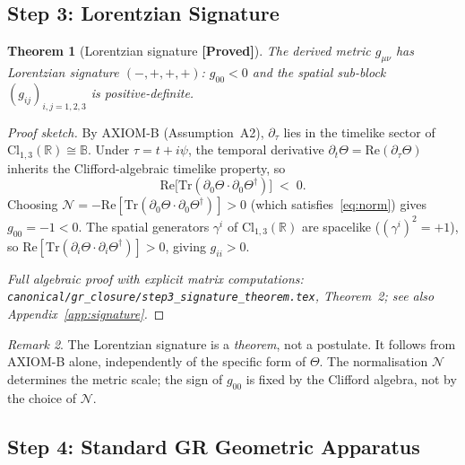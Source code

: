 \documentclass[12pt,a4paper]{article}
\newtheorem{theorem}{Theorem}[section]
\theoremstyle{definition}
\theoremstyle{remark}
\newtheorem{remark}[theorem]{Remark}
\newcommand{\PROVED}{\textbf{[Proved]}}
\newcommand{\B}{\mathbb{B}}
\newcommand{\R}{\mathbb{R}}
\newcommand{\gmn}{g_{\mu\nu}}
\newcommand{\Tr}{\mathrm{Tr}}
\newcommand{\Re}{\mathrm{Re}}
\newcommand{\pT}{\partial_\tau}
\begin{document}
\subsection{Step 3: Lorentzian Signature}
\label{sec:step3}

\begin{theorem}[Lorentzian signature \PROVED]
\label{thm:signature}
The derived metric $\gmn$ has Lorentzian signature $(-,+,+,+)$:
$g_{00} < 0$ and the spatial sub-block $(g_{ij})_{i,j=1,2,3}$ is positive-definite.
\end{theorem}

\begin{proof}[Proof sketch]
By AXIOM-B (Assumption~A2), $\pT$ lies in the timelike sector of
$\mathrm{Cl}_{1,3}(\R) \cong \B$.  Under $\tau = t + i\psi$, the temporal
derivative $\partial_t\Theta = \Re(\partial_\tau\Theta)$ inherits the
Clifford-algebraic timelike property, so
\[
  \Re\bigl[\Tr(\partial_0\Theta \cdot \partial_0\Theta^\dagger)\bigr] \;<\; 0.
\]
Choosing $\mathcal{N} = -\Re[\Tr(\partial_0\Theta\cdot\partial_0\Theta^\dagger)] > 0$
(which satisfies~\eqref{eq:norm}) gives $g_{00} = -1 < 0$.
The spatial generators $\gamma^i$ of $\mathrm{Cl}_{1,3}(\R)$ are spacelike
($(\gamma^i)^2 = +1$), so $\Re[\Tr(\partial_i\Theta\cdot\partial_i\Theta^\dagger)] > 0$,
giving $g_{ii} > 0$.

\noindent\textit{Full algebraic proof with explicit matrix computations:
\texttt{canonical/gr\_closure/step3\_signature\_theorem.tex}, Theorem~2;
see also Appendix~\ref{app:signature}.}
\end{proof}

\begin{remark}
The Lorentzian signature is a \emph{theorem}, not a postulate.  It follows from
AXIOM-B alone, independently of the specific form of $\Theta$.  The normalisation
$\mathcal{N}$ determines the metric scale; the sign of $g_{00}$ is fixed by the
Clifford algebra, not by the choice of $\mathcal{N}$.
\end{remark}

\subsection{Step 4: Standard GR Geometric Apparatus}
\label{sec:step4}
\end{document}
